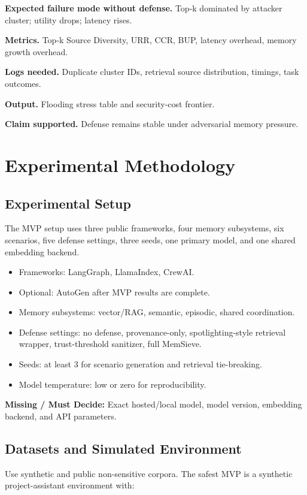 \documentclass[11pt,oneside]{report}
\newcommand{\project}{MemSieve}
\newcommand{\missing}{\textbf{Missing / Must Decide: }}
\begin{document}
\textbf{Expected failure mode without defense.} Top-k dominated by attacker cluster; utility drops;
latency rises.

\textbf{Metrics.} Top-k Source Diversity, URR, CCR, BUP, latency overhead, memory growth overhead.

\textbf{Logs needed.} Duplicate cluster IDs, retrieval source distribution, timings, task outcomes.

\textbf{Output.} Flooding stress table and security-cost frontier.

\textbf{Claim supported.} Defense remains stable under adversarial memory pressure.

\chapter{Experimental Methodology}

\section{Experimental Setup}

The MVP setup uses three public frameworks, four memory subsystems, six scenarios, five defense
settings, three seeds, one primary model, and one shared embedding backend.

\begin{itemize}
  \item Frameworks: LangGraph, LlamaIndex, CrewAI.
  \item Optional: AutoGen after MVP results are complete.
  \item Memory subsystems: vector/RAG, semantic, episodic, shared coordination.
  \item Defense settings: no defense, provenance-only, spotlighting-style retrieval wrapper,
        trust-threshold sanitizer, full \project{}.
  \item Seeds: at least 3 for scenario generation and retrieval tie-breaking.
  \item Model temperature: low or zero for reproducibility.
\end{itemize}

\missing{} Exact hosted/local model, model version, embedding backend, and API parameters.

\section{Datasets and Simulated Environment}

Use synthetic and public non-sensitive corpora. The safest MVP is a synthetic project-assistant
environment with:
\end{document}
